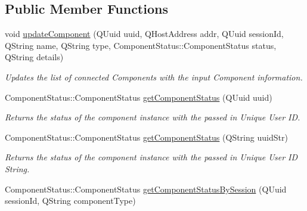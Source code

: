 \subsection*{Public Member Functions}
\begin{DoxyCompactItemize}
\item 
void \hyperlink{class_connection_manager_ab4d8f848dd065a478a6123f8d400c712}{update\-Component} (Q\-Uuid uuid, Q\-Host\-Address addr, Q\-Uuid session\-Id, Q\-String name, Q\-String type, Component\-Status\-::\-Component\-Status status, Q\-String details)
\begin{DoxyCompactList}\small\item\em Updates the list of connected Components with the input Component information. \end{DoxyCompactList}\item 
\hypertarget{class_connection_manager_ab21f514f743abe71fe4d7aaa0c598ccc}{Component\-Status\-::\-Component\-Status \hyperlink{class_connection_manager_ab21f514f743abe71fe4d7aaa0c598ccc}{get\-Component\-Status} (Q\-Uuid uuid)}\label{class_connection_manager_ab21f514f743abe71fe4d7aaa0c598ccc}

\begin{DoxyCompactList}\small\item\em Returns the status of the component instance with the passed in Unique User I\-D. \end{DoxyCompactList}\item 
\hypertarget{class_connection_manager_a12b04c4bb99b3def7483695123317d34}{Component\-Status\-::\-Component\-Status \hyperlink{class_connection_manager_a12b04c4bb99b3def7483695123317d34}{get\-Component\-Status} (Q\-String uuid\-Str)}\label{class_connection_manager_a12b04c4bb99b3def7483695123317d34}

\begin{DoxyCompactList}\small\item\em Returns the status of the component instance with the passed in Unique User I\-D String. \end{DoxyCompactList}\item 
\hypertarget{class_connection_manager_a6009f2afd5adfd7dc30611866bca1171}{Component\-Status\-::\-Component\-Status \hyperlink{class_connection_manager_a6009f2afd5adfd7dc30611866bca1171}{get\-Component\-Status\-By\-Session} (Q\-Uuid session\-Id, Q\-String component\-Type)}\label{class_connection_manager_a6009f2afd5adfd7dc30611866bca1171}


\end{DoxyCompactItemize}
